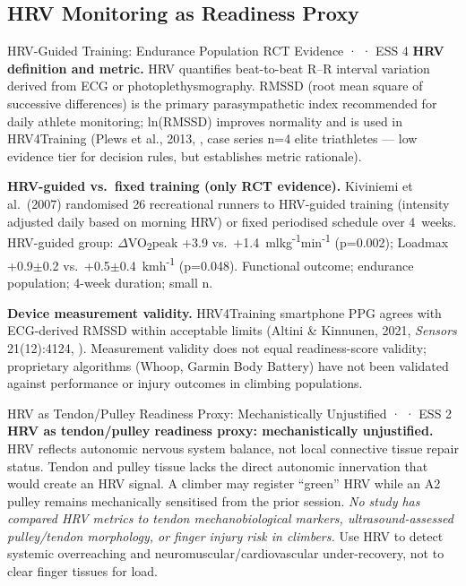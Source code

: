 \subsection{HRV Monitoring as Readiness Proxy}

\begin{evidencebox}{HRV-Guided Training: Endurance Population RCT Evidence · \evidencebacked · ESS 4}
\textbf{HRV definition and metric.} HRV quantifies beat-to-beat R--R interval variation derived from ECG or photoplethysmography. RMSSD (root mean square of successive differences) is the primary parasympathetic index recommended for daily athlete monitoring; ln(RMSSD) improves normality and is used in HRV4Training (Plews et al., 2013, \cite{WHHB+13}, case series n=4 elite triathletes --- low evidence tier for decision rules, but establishes metric rationale).

\textbf{HRV-guided vs.\ fixed training (only RCT evidence).} Kiviniemi et al.\ (2007) randomised 26 recreational runners to HRV-guided training (intensity adjusted daily based on morning HRV) or fixed periodised schedule over 4~weeks. HRV-guided group: $\Delta$VO\textsubscript{2}peak +3.9 vs.\ +1.4~ml\textperiodcentered{}kg\textsuperscript{-1}\textperiodcentered{}min\textsuperscript{-1} (p=0.002); Loadmax +0.9$\pm$0.2 vs.\ +0.5$\pm$0.4~km\textperiodcentered{}h\textsuperscript{-1} (p=0.048). Functional outcome; endurance population; 4-week duration; small n. \cite{KHKT07}

\textbf{Device measurement validity.} HRV4Training smartphone PPG agrees with ECG-derived RMSSD within acceptable limits (Altini \& Kinnunen, 2021, \emph{Sensors} 21(12):4124, \cite{MS21}). Measurement validity does not equal readiness-score validity; proprietary algorithms (Whoop, Garmin Body Battery) have not been validated against performance or injury outcomes in climbing populations.
\end{evidencebox}

\begin{bioplausbox}{HRV as Tendon/Pulley Readiness Proxy: Mechanistically Unjustified · \bioplausible · ESS 2}
\textbf{HRV as tendon/pulley readiness proxy: mechanistically unjustified.} HRV reflects autonomic nervous system balance, not local connective tissue repair status. Tendon and pulley tissue lacks the direct autonomic innervation that would create an HRV signal. A climber may register ``green'' HRV while an A2 pulley remains mechanically sensitised from the prior session. \emph{No study has compared HRV metrics to tendon mechanobiological markers, ultrasound-assessed pulley/tendon morphology, or finger injury risk in climbers.} Use HRV to detect systemic overreaching and neuromuscular/cardiovascular under-recovery, not to clear finger tissues for load.
\end{bioplausbox}

